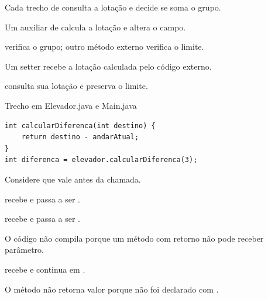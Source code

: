 \documentclass[11pt,a4paper]{article}
\begin{document}
\begin{minipage}[t]{.485\textwidth}
\begin{alternativas}
\item Cada trecho de  consulta a lotação e decide se soma o grupo.
\item Um auxiliar de  calcula a lotação e altera o campo.
\item {} verifica o grupo; outro método externo verifica o limite.
\item Um setter recebe a lotação calculada pelo código externo.
\item {} consulta sua lotação e preserva o limite.
\end{alternativas}
\begin{painelEvolucao}{Trecho em Elevador.java e Main.java}
\begin{lstlisting}[style=cenariocodigo]
int calcularDiferenca(int destino) {
    return destino - andarAtual;
}
int diferenca = elevador.calcularDiferenca(3);
\end{lstlisting}
\end{painelEvolucao}
Considere que  vale  antes da chamada.
\begin{alternativas}
\item {} recebe  e  passa a ser .
\item {} recebe  e  passa a ser .
\item O código não compila porque um método com retorno  não pode receber parâmetro.
\item {} recebe  e  continua em .
\item O método não retorna valor porque não foi declarado com .
\end{alternativas}

\end{minipage}
\end{document}
